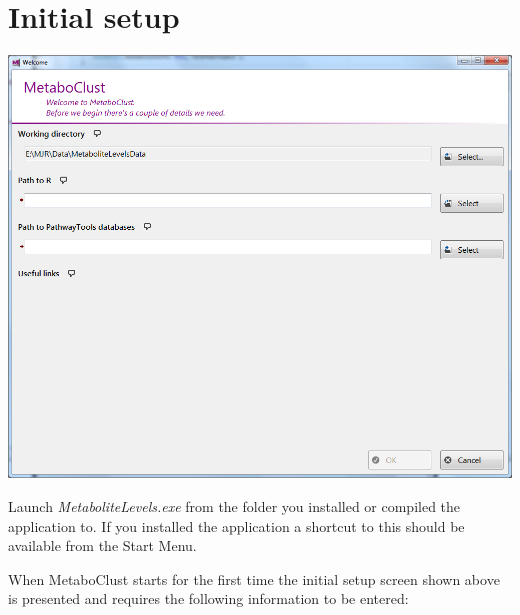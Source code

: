 \documentclass[11pt,a4paper]{article}
\newcommand{\menu}[1]{ \flqq\textit{#1}\frqq}
\begin{document}
\section{Initial setup}
\label{section:ug_initial_setup}
\begin{center}
\includegraphics[max width=0.7\linewidth]{"Images/userguide/initial setup"}
\end{center}
Launch \menu{MetaboliteLevels.exe} from the folder you installed or compiled the application to. If you installed the application a shortcut to this should be available from the Start Menu.

When MetaboClust starts for the first time the initial setup screen shown above is presented and requires the following information to be entered:
\end{document}
